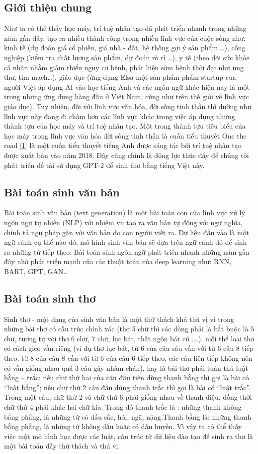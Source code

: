 \documentclass[a4paper]{article}
\theoremstyle{definition}
\begin{document}
\subsection{Giới thiệu chung}
Như ta có thể thấy học máy, trí tuệ nhân tạo đã phát triển nhanh trong những năm gần đây, tạo ra nhiều thành công trong nhiều lĩnh vực của cuộc sống như: kinh tế (dự đoán giá cổ phiếu, giá nhà - đất, hệ thống gợi ý sản phẩm….), công nghiệp (kiểm tra chất lượng sản phẩm, dự đoán rò rỉ …), y tế (theo dõi sức khỏe cá nhân nhằm giảm thiểu nguy cơ bệnh, phát hiện sớm bệnh thời đại như ung thư, tim mạch…), giáo dục (ứng dụng Elsa một sản phẩm phẩm startup của người Việt áp dụng AI vào học tiếng Anh và các ngôn ngữ khác hiện nay là một trong những ứng dụng hàng đầu ở Việt Nam, cũng như trên thế giới về lĩnh vực giáo dục). Tuy nhiên, đối với lĩnh vực văn hóa, đời sống tinh thần thì dường như lĩnh vực này đang đi chậm hơn các lĩnh vực khác trong việc áp dụng những thành tựu của học máy và trí tuệ nhân tạo. Một trong thành tựu tiêu biểu của học máy trong lĩnh vực văn hóa đời sống tinh thần là cuốn tiểu thuyết One the road \href{https://en.wikipedia.org/wiki/1_the_Road}{[1]} là một cuốn tiểu thuyểt tiếng Anh được sáng tác bởi trí tuệ nhân tạo được xuất bản vào năm 2018. Đây cũng chính là động lực thúc đẩy để chúng tôi phát triển đề tài sử dụng GPT-2 để sinh thơ bằng tiếng Việt này. 
\subsection{Bài toán sinh văn bản}
Bài toán sinh văn bản (text generation)  là một bài toán con của lĩnh vực xử lý ngôn ngữ tự nhiên (NLP) với nhiệm vụ tạo ra văn bản tự động với ngữ nghĩa, chính tả ngữ pháp gần với văn bản do con người viết ra. Dữ liệu đầu vào là một ngữ cảnh cụ thể nào đó, mô hình sinh văn bản sẽ dựa trên ngữ cảnh đó để sinh ra những từ tiếp theo. Bài toán sinh ngôn ngữ phát triển nhanh những năm gần đây nhờ phát triển mạnh của các thuật toán của deep learning như: RNN, BART, GPT, GAN… 
\subsection{Bài toán sinh thơ}
Sinh thơ - một dạng của sinh văn bản là một thử thách khá thú vị vì trong những bài thơ có cấu trúc chính xác (thơ 5 chữ thì các dòng phải là bắt buộc là 5 chữ, tương tự với thơ 6 chữ, 7 chữ, lục bát, thất ngôn bát cú ….), mỗi thể loại thơ có cách gieo vần riêng (ví dụ thơ lục bát, từ 6 của câu sáu vần với từ 6 câu 8 tiếp theo, từ 8 của câu 8 vần với từ 6 của câu 6 tiếp theo, các câu liên tiếp không nên có vần giống nhau quá 3 câu gây nhàm chán), hay là bài thơ phải tuân thủ luật bằng – trắc: nếu chữ thứ hai của câu đầu tiên dùng thanh bằng thì gọi là bài có “luật bằng”; nếu chữ thứ 2 câu đầu dùng thanh trắc thì gọi là bài có “luật trắc”. Trong một câu, chữ thứ 2 và chữ thứ 6 phải giống nhau về thanh điệu, đồng thời chữ thứ 4 phải khác hai chữ kia. Trong đó thanh trắc là : những thanh không bằng phẳng, là những từ có dấu sắc, hỏi, ngã, nặng.Thanh bằng là: những thanh bằng phẳng, là những từ không dấu hoặc có dấu huyền. Vì vậy ta có thể thấy việc một mô hình học được các luật, cấu trúc từ dữ liệu đào tạo để sinh ra thơ là một bài toán đầy thử thách và thú vị. 
\end{document}
